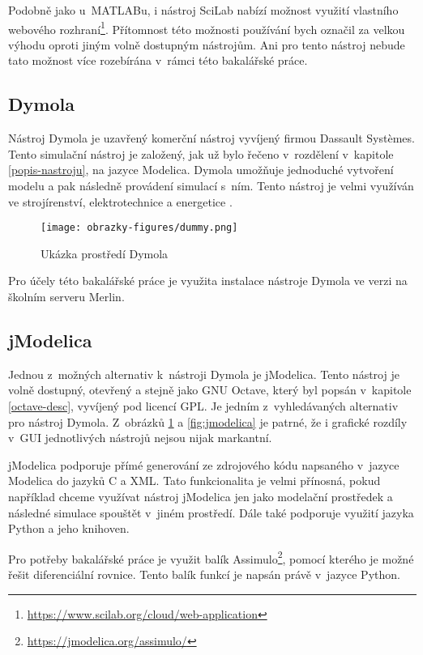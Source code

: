 Podobně jako u~MATLABu, i nástroj SciLab nabízí možnost využití vlastního webového rozhraní\footnote{\url{https://www.scilab.org/cloud/web-application}}. Přítomnost této možnosti používání bych označil za velkou výhodu oproti jiným volně dostupným nástrojům. Ani pro tento nástroj nebude tato možnost více rozebírána v~rámci této bakalářské práce.


\subsection{Dymola}
\label{dymola-desc}

Nástroj Dymola je uzavřený komerční nástroj vyvíjený firmou Dassault Systèmes. Tento simulační nástroj je založený, jak už bylo řečeno v~rozdělení v~kapitole \ref{popis-nastroju}, na jazyce Modelica. Dymola umožňuje jednoduché vytvoření modelu a pak následně provádení simulací s~ním. Tento nástroj je velmi využíván ve strojírenství, elektrotechnice a energetice .

\begin{figure}
    \centering
    \texttt{[image: obrazky-figures/dummy.png]}
    \caption{Ukázka prostředí Dymola}
    \label{fig:dymola}
\end{figure}

Pro účely této bakalářské práce je využita instalace nástroje Dymola ve verzi  na školním serveru Merlin.


\subsection{jModelica}
Jednou z~možných alternativ k~nástroji Dymola je jModelica. Tento nástroj je volně dostupný, otevřený a stejně jako GNU Octave, který byl popsán v~kapitole \ref{octave-desc}, vyvíjený pod licencí GPL. Je jedním z~vyhledávaných alternativ pro nástroj Dymola. Z~obrázků \ref{fig:dymola} a \ref{fig:jmodelica} je patrné, že i grafické rozdíly v~GUI jednotlivých nástrojů nejsou nijak markantní.

jModelica podporuje přímé generování ze zdrojového kódu napsaného v~jazyce Modelica do jazyků C a XML. Tato funkcionalita je velmi přínosná, pokud například chceme využívat nástroj jModelica jen jako modelační prostředek a následné simulace spouštět v~jiném prostředí. Dále také podporuje využití jazyka Python a jeho knihoven.

Pro potřeby bakalářské práce je využit balík Assimulo\footnote{\url{https://jmodelica.org/assimulo/}}, pomocí kterého je možné řešit diferenciální rovnice. Tento balík funkcí je napsán právě v~jazyce Python.


